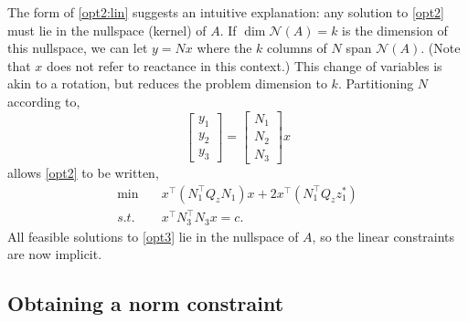 \documentclass[conference]{IEEEtran}
\begin{document}
The form of \eqref{opt2:lin} suggests an intuitive explanation: any
solution to \eqref{opt2} must lie in the nullspace (kernel) of $A$. If
$\dim \mathcal{N}(A) =k$ is the dimension of this nullspace, we can
let $y=Nx$ where the $k$ columns of $N$ span $\mathcal{N}(A)$. (Note
that $x$ does not refer to reactance in this context.) This change of
variables is akin to a rotation, but reduces the problem dimension to
$k$. Partitioning $N$ according to,
\[
\begin{bmatrix} y_1 \\ y_2 \\ y_3 \end{bmatrix} = \begin{bmatrix} N_1
  \\ N_2 \\ N_3 \end{bmatrix} x
\]
allows \eqref{opt2} to be written,
\begin{subequations}\label{opt3}
\begin{align}
\label{opt3:obj} \min\quad  &x^\top (N_1^\top Q_zN_1) x + 2x^\top
(N_1^\top Q_zz_1^*) \\
\label{opt3:quad} s.t.\quad &x^\top N_3^\top N_3 x = c.
\end{align}
\end{subequations}
All feasible solutions to \eqref{opt3} lie in the nullspace of $A$, so
the linear constraints are now implicit.

\subsection{Obtaining a norm constraint}
\end{document}
